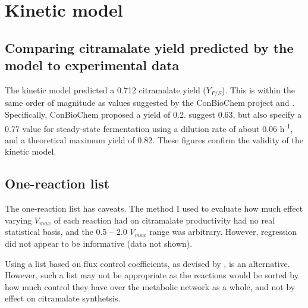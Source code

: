\documentclass[parskip=full, numbers=noenddot]{scrreprt}
\begin{document}

\section{Kinetic model}
\label{sec:discussion-kinetic}


\subsection{Comparing citramalate yield predicted by the model to experimental data}
\label{ssec:discussion-kinetic-experimental}

The kinetic model predicted a 0.712 citramalate yield ($Y_{P/S}$). This is within the same order of magnitude as values suggested by the ConBioChem project and \citet{wu_production_2016}. Specifically, ConBioChem proposed a yield of 0.2. \citet{wu_production_2016} suggest 0.63, but also specify a 0.77 value for steady-state fermentation using a dilution rate of about 0.06 h\textsuperscript{-1}, and a theoretical maximum yield of 0.82. These figures confirm the validity of the kinetic model.

\subsection{One-reaction list}
\label{ssec:discussion-kinetic-onereaction}

The one-reaction list has caveats. The method I used to evaluate how much effect varying $V_{max}$ of each reaction had on citramalate productivity had no real statistical basis, and the 0.5 -- 2.0 $V_{max}$ range was arbitrary. However, regression did not appear to be informative (data not shown).

Using a list based on flux control coefficients, as devised by \citet{millard_metabolic_2017}, is an alternative. However, such a list may not be appropriate as the reactions would be sorted by how much control they have over the metabolic network as a whole, and not by effect on citramalate synthetsis.
\end{document}
